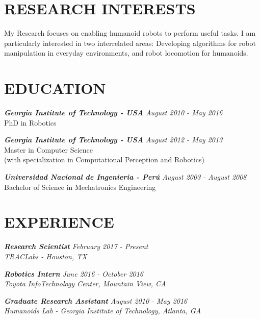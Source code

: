 \documentclass[margin]{res}
\begin{document}
\begin{resume}
 
\section{RESEARCH INTERESTS} My Research focuses on enabling humanoid robots to perform useful tasks.
I am particularly interested in two interrelated areas: Developing algorithms for robot manipulation in everyday environments, and robot locomotion for humanoids.

\section{EDUCATION} 

				{\sl \textbf{Georgia Institute of Technology - USA} \hfill August 2010 - May 2016} \\
                PhD in Robotics 
                       
				{\sl \textbf{Georgia Institute of Technology - USA} \hfill August 2012 - May 2013} \\
                Master in Computer Science \\
                (with specialization in Computational Perception and Robotics) 
                
				{\sl \textbf{Universidad Nacional de Ingenieria - Per\'{u}} \hfill August 2003 - August 2008} \\
                Bachelor of Science in Mechatronics Engineering  \\
     
\section{EXPERIENCE} 

                {\sl \textbf{Research Scientist}        \hfill    February 2017 - Present} \\
                {\sl TRACLabs - Houston, TX} 

                {\sl \textbf{Robotics Intern} \hfill            June 2016 - October 2016} \\
                {\sl Toyota InfoTechnology Center, Mountain View, CA}

                {\sl \textbf{Graduate Research Assistant} \hfill            August 2010 - May 2016} \\
                {\sl Humanoids Lab - Georgia Institute of Technology, Atlanta, GA}


\end{resume}
\end{document}
